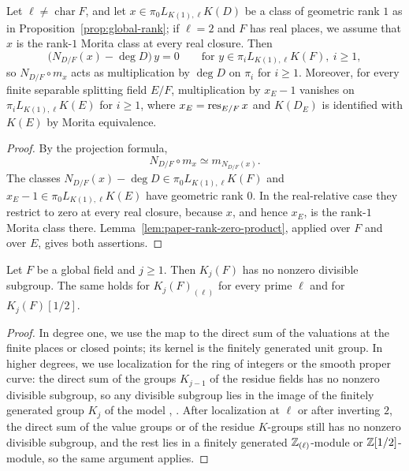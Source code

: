 \begin{lemma}\label{lem:paper-global-product-vanishing}
Let $\ell\ne\operatorname{char}F$, and let $x\in\pi_0L_{K(1),\ell}K(D)$ be a class of geometric rank $1$ as in Proposition~\ref{prop:global-rank}; if $\ell=2$ and $F$ has real places, we assume that $x$ is the rank-$1$ Morita class at every real closure.
Then
\[
 \bigl(N_{D/F}(x)-\deg D\bigr)\,y=0\qquad\text{for }y\in\pi_iL_{K(1),\ell}K(F),\ i\ge1,
\]
so $N_{D/F}\circ m_x$ acts as multiplication by $\deg D$ on $\pi_i$ for $i\ge1$.
Moreover, for every finite separable splitting field $E/F$, multiplication by $x_E-1$ vanishes on $\pi_iL_{K(1),\ell}K(E)$ for $i\ge1$, where $x_E=\operatorname{res}_{E/F}x$ and $K(D_E)$ is identified with $K(E)$ by Morita equivalence.
\end{lemma}
\begin{proof}
By the projection formula,
\[
 N_{D/F}\circ m_x\simeq m_{N_{D/F}(x)}.
\]
The classes $N_{D/F}(x)-\deg D\in\pi_0L_{K(1),\ell}K(F)$ and $x_E-1\in\pi_0L_{K(1),\ell}K(E)$ have geometric rank $0$.
In the real-relative case they restrict to zero at every real closure, because $x$, and hence $x_E$, is the rank-$1$ Morita class there.
Lemma~\ref{lem:paper-rank-zero-product}, applied over $F$ and over $E$, gives both assertions.
\end{proof}

\begin{lemma}\label{lem:paper-global-no-divisible}
Let $F$ be a global field and $j\ge1$.
Then $K_j(F)$ has no nonzero divisible subgroup.
The same holds for $K_j(F)_{(\ell)}$ for every prime $\ell$ and for $K_j(F)[1/2]$.
\end{lemma}
\begin{proof}
In degree one, we use the map to the direct sum of the valuations at the finite places or closed points; its kernel is the finitely generated unit group.
In higher degrees, we use localization for the ring of integers or the smooth proper curve: the direct sum of the groups $K_{j-1}$ of the residue fields has no nonzero divisible subgroup, so any divisible subgroup lies in the image of the finitely generated group $K_j$ of the model \cite{QuillenHigher,QuillenCurve,QuillenFinite}, \cite[Theorem 1]{QuillenFiniteGeneration}.
After localization at $\ell$ or after inverting $2$, the direct sum of the value groups or of the residue $K$-groups still has no nonzero divisible subgroup, and the rest lies in a finitely generated $\mathbb Z_{(\ell)}$-module or $\mathbb Z[1/2]$-module, so the same argument applies.
\end{proof}

